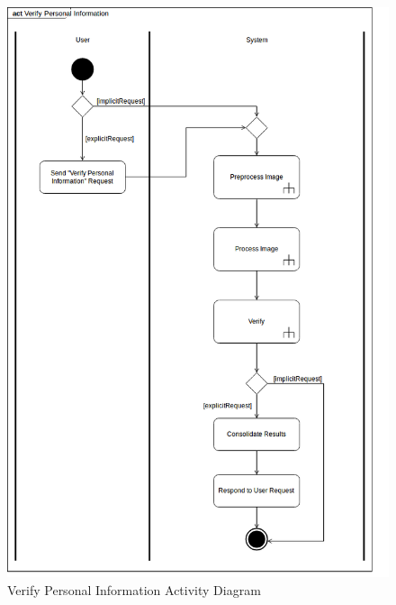 \documentclass{article}
\begin{document}
	\begin{figure}[h]
		\centering
		\includegraphics[scale=0.455]{img/verify_personal_info_activity.png}
		\caption{Verify Personal Information Activity Diagram}
	\end{figure}
\pagebreak
\end{document}
